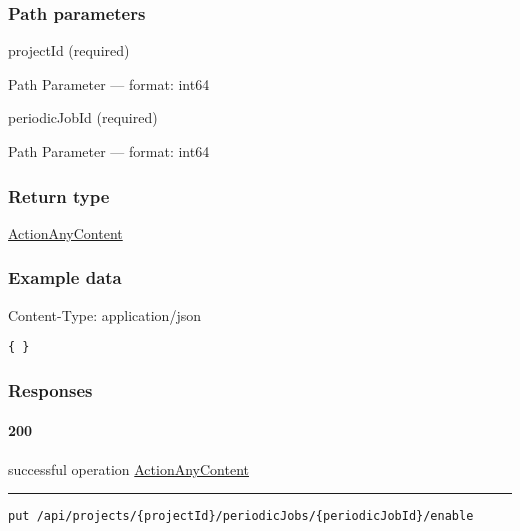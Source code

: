 \hypertarget{path-parameters-12}{%
\subsubsection*{Path parameters}\label{path-parameters-12}}

projectId (required)

{Path Parameter} --- format: int64

periodicJobId (required)

{Path Parameter} --- format: int64

\hypertarget{return-type-14}{%
\subsubsection*{Return type}\label{return-type-14}}

\protect\hyperlink{ActionAnyContent}{ActionAnyContent}

\hypertarget{example-data-14}{%
\subsubsection*{Example data}\label{example-data-14}}

Content-Type: application/json

\begin{verbatim}
{ }
\end{verbatim}

\hypertarget{responses-14}{%
\subsubsection*{Responses}\label{responses-14}}

\hypertarget{section-53}{%
\paragraph{200}\label{section-53}}

successful operation
\protect\hyperlink{ActionAnyContent}{ActionAnyContent}

\begin{center}\rule{0.5\linewidth}{0.5pt}\end{center}

\protect\hypertarget{enable}{}{}



\begin{verbatim}
put /api/projects/{projectId}/periodicJobs/{periodicJobId}/enable
\end{verbatim}

